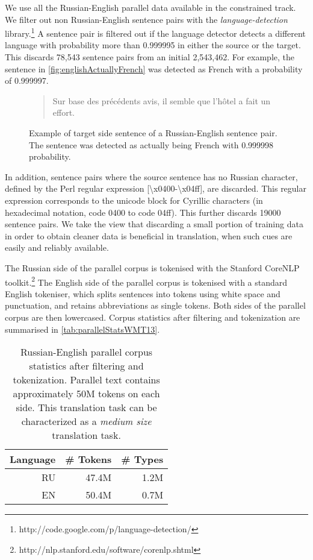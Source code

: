 We use all the Russian-English parallel data available in the constrained track.
We filter out non Russian-English sentence pairs with the
\emph{language-detection} library.\footnote{http://code.google.com/p/language-detection/}
A sentence pair is filtered out if the language detector detects a different language with probability
more than 0.999995 in either the source or the target.
This discards 78,543 sentence pairs from an initial 2,543,462.
For example, the sentence in \autoref{fig:englishActuallyFrench} was detected as French with
a probability of 0.999997.
%
\begin{figure}
\begin{quote}
Sur base des précédents avis, il semble que l'hôtel a fait un effort.
\end{quote}
\caption{Example of target side sentence of a Russian-English sentence pair. The sentence was detected as actually being French with 0.999998 probability.}
\label{fig:englishActuallyFrench}
\end{figure}
%
In addition, sentence pairs where the source sentence has no Russian character, defined by the
Perl regular expression [{\textbackslash}x{0400}-{\textbackslash}x{04ff}], are discarded.
This regular expression corresponds to the unicode block for Cyrillic
characters (in hexadecimal notation, code 0400 to code 04ff).
This further discards 19000 sentence pairs. We take the view
that discarding a small portion of training data in order to
obtain cleaner data is beneficial in translation, when such cues are easily and
reliably available.

The Russian side of the parallel corpus is tokenised with the
Stanford CoreNLP toolkit.\footnote{http://nlp.stanford.edu/software/corenlp.shtml}
The English side of the parallel corpus is tokenised with a standard English tokeniser,
which splits sentences into tokens using white space and punctuation, and retains
abbreviations as single tokens.
Both sides of the parallel corpus are then lowercased. %
Corpus statistics after filtering and tokenization are summarised in
\autoref{tab:parallelStatsWMT13}.
%
\begin{table}[htbp]
\begin{center}
\begin{tabular}{*{3}{|r}|}
\hline
Language & \# Tokens & \# Types \\
\hline
\hline
RU & 47.4M & 1.2M \\
\hline
EN & 50.4M & 0.7M \\
\hline
\end{tabular}
\end{center}
\caption{Russian-English parallel corpus statistics after filtering
  and tokenization.
  Parallel text contains approximately 50M tokens on each side. This translation
  task can be characterized as a \emph{medium size} translation task.}
\label{tab:parallelStatsWMT13}
\end{table}
%


